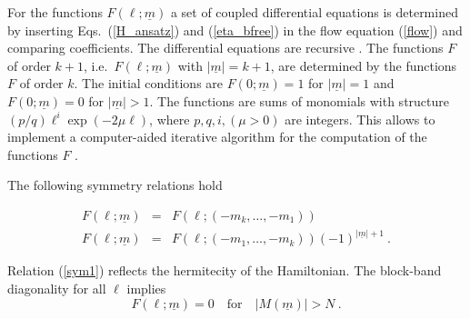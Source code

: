 For the  functions $F(\ell;\underline{m})$  a set of 
coupled differential equations is determined by
inserting Eqs.~(\ref{H_ansatz}) and (\ref{eta_bfree}) in the flow
equation (\ref{flow}) and comparing coefficients. The differential
equations are recursive \cite{knett00a}. The functions $F$ of order $k+1$,
i.e.\ $F(\ell;{\underline m})$ with $|{\underline m}|=k+1$, are
determined by the functions $F$ of order $k$. 
The initial conditions are $F(0;{\underline m})=1$ for $|{\underline m}|=1$
and $F(0;{\underline m})=0$ for $|{\underline m}|>1$.
The functions are sums of monomials with structure
$(p/q)\ell^i\exp(-2\mu \ell)$, where $p,q,i,(\mu>0)$ are integers. 
This allows to implement a computer-aided iterative algorithm for the
 computation of the functions $F$ \cite{knett00a}. 

The following symmetry relations hold
\begin{mathletters}
\label{F_sym}
\begin{eqnarray}
  \label{sym1}
  F(\ell;{\underline m})&=&F(\ell;(-m_k,\ldots,-m_1))\\
  F(\ell;{\underline m})&=&F(\ell;(-m_1,\ldots,-m_k))(-1)^{|{\underline m}|+1}
\ .
\end{eqnarray}
\end{mathletters}
Relation (\ref{sym1}) reflects the hermitecity of the Hamiltonian.
The block-band diagonality  for all $\ell$ implies
\begin{equation}
\label{F_block}
F(\ell;{\underline m})=0\quad \mbox{for}\quad  |M(\underline m)|>N\ .
\end{equation}

